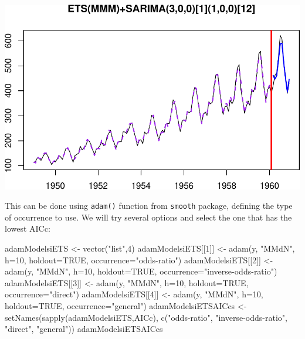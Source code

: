 \documentclass[
]{book}
\newenvironment{Shaded}{\begin{snugshade}}{\end{snugshade}}
\newcommand{\AttributeTok}[1]{\textcolor[rgb]{0.77,0.63,0.00}{#1}}
\newcommand{\ConstantTok}[1]{\textcolor[rgb]{0.00,0.00,0.00}{#1}}
\newcommand{\DecValTok}[1]{\textcolor[rgb]{0.00,0.00,0.81}{#1}}
\newcommand{\FunctionTok}[1]{\textcolor[rgb]{0.00,0.00,0.00}{#1}}
\newcommand{\NormalTok}[1]{#1}
\newcommand{\OtherTok}[1]{\textcolor[rgb]{0.56,0.35,0.01}{#1}}
\newcommand{\StringTok}[1]{\textcolor[rgb]{0.31,0.60,0.02}{#1}}
\theoremstyle{definition}
\theoremstyle{definition}
\theoremstyle{definition}
\theoremstyle{definition}
\theoremstyle{remark}
\begin{document}
\includegraphics{adam_files/figure-latex/unnamed-chunk-121-1.pdf}

This can be done using \texttt{adam()} function from \texttt{smooth} package, defining the type of occurrence to use. We will try several options and select the one that has the lowest AICc:

\begin{Shaded}
\begin{Highlighting}[]
\NormalTok{adamModelsiETS }\OtherTok{\textless{}{-}} \FunctionTok{vector}\NormalTok{(}\StringTok{"list"}\NormalTok{,}\DecValTok{4}\NormalTok{)}
\NormalTok{adamModelsiETS[[}\DecValTok{1}\NormalTok{]] }\OtherTok{\textless{}{-}} \FunctionTok{adam}\NormalTok{(y, }\StringTok{"MMdN"}\NormalTok{, }\AttributeTok{h=}\DecValTok{10}\NormalTok{, }\AttributeTok{holdout=}\ConstantTok{TRUE}\NormalTok{,}
                            \AttributeTok{occurrence=}\StringTok{"odds{-}ratio"}\NormalTok{)}
\NormalTok{adamModelsiETS[[}\DecValTok{2}\NormalTok{]] }\OtherTok{\textless{}{-}} \FunctionTok{adam}\NormalTok{(y, }\StringTok{"MMdN"}\NormalTok{, }\AttributeTok{h=}\DecValTok{10}\NormalTok{, }\AttributeTok{holdout=}\ConstantTok{TRUE}\NormalTok{,}
                            \AttributeTok{occurrence=}\StringTok{"inverse{-}odds{-}ratio"}\NormalTok{)}
\NormalTok{adamModelsiETS[[}\DecValTok{3}\NormalTok{]] }\OtherTok{\textless{}{-}} \FunctionTok{adam}\NormalTok{(y, }\StringTok{"MMdN"}\NormalTok{, }\AttributeTok{h=}\DecValTok{10}\NormalTok{, }\AttributeTok{holdout=}\ConstantTok{TRUE}\NormalTok{,}
                            \AttributeTok{occurrence=}\StringTok{"direct"}\NormalTok{)}
\NormalTok{adamModelsiETS[[}\DecValTok{4}\NormalTok{]] }\OtherTok{\textless{}{-}} \FunctionTok{adam}\NormalTok{(y, }\StringTok{"MMdN"}\NormalTok{, }\AttributeTok{h=}\DecValTok{10}\NormalTok{, }\AttributeTok{holdout=}\ConstantTok{TRUE}\NormalTok{,}
                            \AttributeTok{occurrence=}\StringTok{"general"}\NormalTok{)}
\NormalTok{adamModelsiETSAICcs }\OtherTok{\textless{}{-}}
    \FunctionTok{setNames}\NormalTok{(}\FunctionTok{sapply}\NormalTok{(adamModelsiETS,AICc),}
             \FunctionTok{c}\NormalTok{(}\StringTok{"odds{-}ratio"}\NormalTok{, }\StringTok{"inverse{-}odds{-}ratio"}\NormalTok{,}
               \StringTok{"direct"}\NormalTok{, }\StringTok{"general"}\NormalTok{))}
\NormalTok{adamModelsiETSAICcs}
\end{Highlighting}
\end{Shaded}
\end{document}
